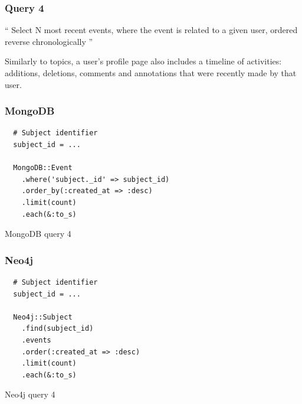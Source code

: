\subsubsection{Query 4}
\label{subsubsec:query-4}

``
Select N most recent events, where the event is related to a given user, ordered reverse chronologically
''

Similarly to topics, a user's profile page also includes a timeline of  activities: additions, deletions, comments and annotations that were recently made by that user.

\subsubsection*{MongoDB}

\begin{listing}[H]
  \begin{verbatim}
  # Subject identifier
  subject_id = ...

  MongoDB::Event
    .where('subject._id' => subject_id)
    .order_by(:created_at => :desc)
    .limit(count)
    .each(&:to_s)
  \end{verbatim}

  \caption{MongoDB query 4}
  \label{lst:mongodb-query-4}
\end{listing}

\subsubsection*{Neo4j}

\begin{listing}[H]
  \begin{verbatim}
  # Subject identifier
  subject_id = ...

  Neo4j::Subject
    .find(subject_id)
    .events
    .order(:created_at => :desc)
    .limit(count)
    .each(&:to_s)
  \end{verbatim}

  \caption{Neo4j query 4}
  \label{lst:neo4j-query-4}
\end{listing}

